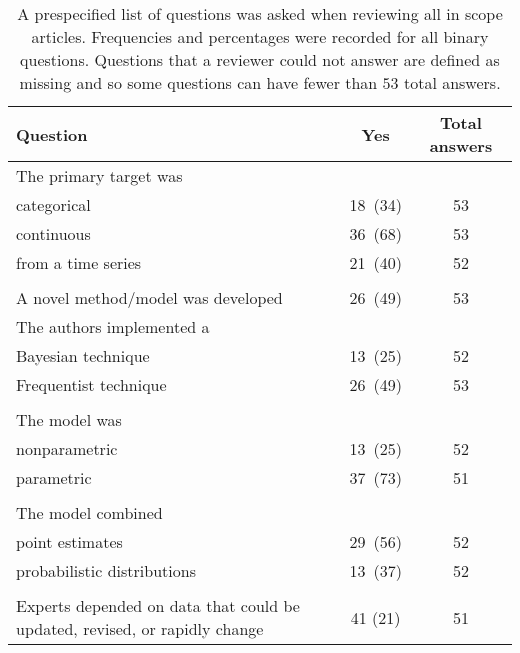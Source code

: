\documentclass[preprint]{elsarticle}
\begin{document}
\begin{table*}[ht!]
    \centering 
  \begin{tabular}{ L{5.5cm}cc }
    \hline
    Question                                                                    & Yes  & Total answers \\
    \hline
    The primary target was\\
    \hspace{3mm}categorical                                                     &  18~(34)  & 53 \\ 
    \hspace{3mm}continuous                                                      &  36~(68)  & 53 \\
    \hspace{3mm}from a time series                                              &  21~(40)  & 52 \\
 \\
    A novel method/model was developed                                          & 26~(49)  & 53 \\   
    The authors implemented a\\
\hspace{3mm}Bayesian technique                                                  & 13~(25)  & 52 \\
    \hspace{3mm}Frequentist technique                                           & 26~(49)  & 53 \\ 
 \\   
    The model was\\
    \hspace{3mm}nonparametric                                                   & 13~(25) & 52 \\
    \hspace{3mm}parametric                                                      & 37~(73) & 51 \\
\\
    The model combined\\
    \hspace{3mm}point estimates                                                 & 29~(56) & 52 \\ 
    \hspace{3mm}probabilistic distributions                                     & 13~(37) & 52 \\
\\    
    Experts depended on data that could be updated, revised, or rapidly change  & 41 (21) & 51 \\
 \hline
  \end{tabular}
  \caption{
  A prespecified list of questions was asked when reviewing all in scope articles. 
  Frequencies and percentages were recorded for all binary questions.
  Questions that a reviewer could not answer are defined as missing and so some questions can have fewer than $53$ total answers. 
  \label{tbl.question}}
\end{table*}
\end{document}
